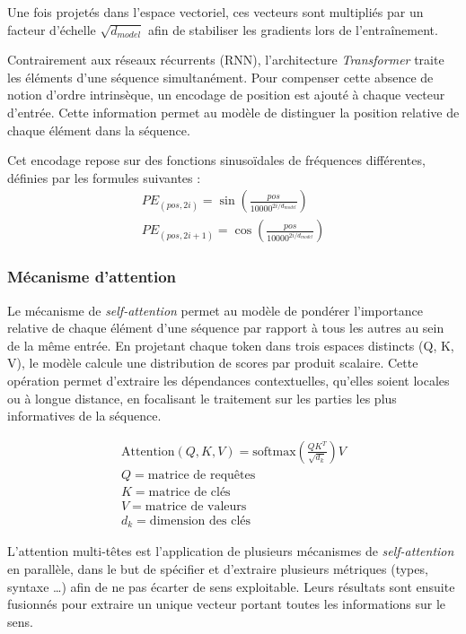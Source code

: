 \documentclass[12pt]{report}
\begin{document}
    Une fois projetés dans l'espace vectoriel, ces vecteurs sont multipliés par un facteur d'échelle $\sqrt{d_{model}}$ afin de stabiliser les gradients lors de l'entraînement.

    Contrairement aux réseaux récurrents (RNN), l'architecture \textit{Transformer} traite les éléments d'une séquence simultanément. Pour compenser cette absence de notion d'ordre intrinsèque, un encodage de position est ajouté à chaque vecteur d'entrée. Cette information permet au modèle de distinguer la position relative de chaque élément dans la séquence.

    Cet encodage repose sur des fonctions sinusoïdales de fréquences différentes, définies par les formules suivantes : 
    \begin{gather}
        PE_{(pos, 2i)} = \sin\left(\frac{pos}{10000^{2i/d_{model}}}\right) \label{eq:positional_encoding}\\[10pt] 
        PE_{(pos, 2i+1)} = \cos\left(\frac{pos}{10000^{2i/d_{model}}}\right) \label{eq:positional_encoding_cos}
    \end{gather}

    \subsubsection{Mécanisme d'attention}\label{subsubsec:mecanisme_attention}
    Le mécanisme de \textit{self-attention} permet au modèle de pondérer l'importance relative de chaque élément d'une séquence par rapport à tous les autres au sein de la même entrée. En projetant chaque token dans trois espaces distincts (Q, K, V), le modèle calcule une distribution de scores par produit scalaire. Cette opération permet d'extraire les dépendances contextuelles, qu'elles soient locales ou à longue distance, en focalisant le traitement sur les parties les plus informatives de la séquence.

    \begin{gather}
        \text{Attention}(Q, K, V) = \text{softmax}\left(\frac{QK^T}{\sqrt{d_k}}\right)V \label{eq:attention} \\[10pt]
        Q = \text{matrice de requêtes} \nonumber \\
        K = \text{matrice de clés} \nonumber \\
        V = \text{matrice de valeurs} \nonumber \\
        d_k = \text{dimension des clés} \nonumber
    \end{gather}

    L'attention multi-têtes est l'application de plusieurs mécanismes de \textit{self-attention} en parallèle, dans le but de spécifier et d'extraire plusieurs métriques (types, syntaxe …) afin de ne pas écarter de sens exploitable. Leurs résultats sont ensuite fusionnés pour extraire un unique vecteur portant toutes les informations sur le sens.
\end{document}
